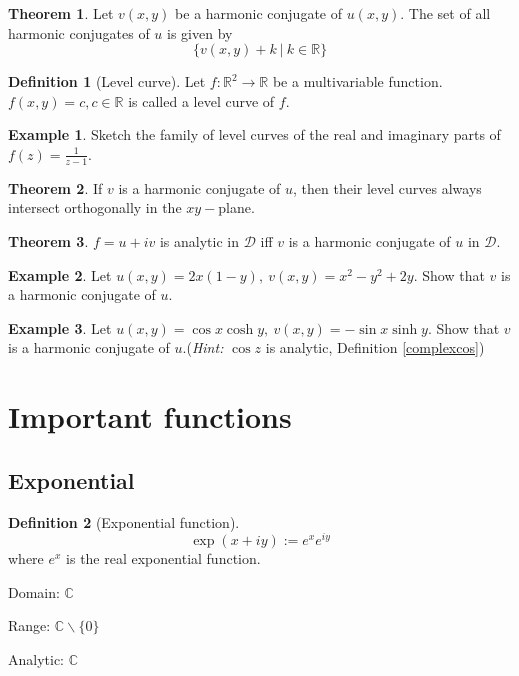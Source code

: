 \documentclass[10pt, a4paper]{extarticle}
\theoremstyle{definition}
\newtheorem{thm}{Theorem}
\newtheorem{defn}{Definition}
\newtheorem{eg}{Example}
\begin{document}
	\begin{thm}
		Let $v(x,y)$ be a harmonic conjugate of $u(x,y)$. The set of all harmonic conjugates of $u$ is given by
		\[\{v(x,y)+k\ |\ k\in \mathbb{R}\}\]
	\end{thm}

	\begin{defn}[Level curve]
		Let $f:\mathbb{R}^2\to\mathbb{R}$ be a multivariable function. $f(x,y)=c, c\in\mathbb{R}$ is called a level curve of $f$.
	\end{defn}
	\begin{eg}
		Sketch the family of level curves of the real and imaginary parts of $f(z)=\frac{1}{z-1}$.
	\end{eg}

	\begin{thm}
		If $v$ is a harmonic conjugate of $u$, then their level curves always intersect orthogonally in the $xy-$plane.
	\end{thm}

	\begin{thm}
		$f=u+iv$ is analytic in $\mathscr{D}$ iff $v$ is a harmonic conjugate of $u$ in $\mathscr{D}$.
	\end{thm}
	\begin{eg}
		Let $u(x,y)=2x(1-y),\ v(x,y)=x^2-y^2+2y$. Show that $v$ is a harmonic conjugate of $u$.
	\end{eg}
	\begin{eg}
		Let $u(x,y)=\cos x\cosh y,\ v(x,y)=-\sin x\sinh y$. Show that $v$ is a harmonic conjugate of $u$.(\textit{Hint: }$\cos z$ is analytic, Definition \ref{complexcos})
	\end{eg}

	\section{Important functions}
	\subsection{Exponential}
	\begin{defn}[Exponential function]
		\[\exp(x+iy):=e^{x}e^{iy}\]
		where $e^x$ is the real exponential function.

		Domain: $\mathbb{C}$

		Range: $\mathbb{C}\backslash\{0\}$

		Analytic: $\mathbb{C}$
	\end{defn}
\end{document}
